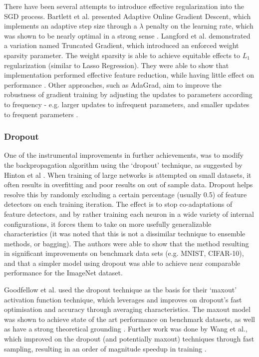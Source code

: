 \documentclass[a4paper,11pt,oneside]{article}
\theoremstyle{plain}
\theoremstyle{definition}
\begin{document}
	There have been several attempts to introduce effective regularization into the SGD process. Bartlett et al. 
	presented Adaptive Online Gradient Descent, which implements an adaptive step size through a $\lambda$ 
	penalty on the learning rate, which was shown to be nearly optimal in a strong sense \cite{Bartlett}. Langford et al. 
	demonstrated a variation named Truncated Gradient, which introduced an enforced weight sparsity parameter. 
	The weight sparsity is able to achieve equitable effects to $L_1$ regularization (similar to Lasso Regression). 
	They were able to show that implementation performed effective feature reduction, while having little effect on 
	performance \cite{Langford}. Other approaches, such as AdaGrad, aim to improve the robustness of gradient training by 
	adjusting the updates to parameters according to frequency - e.g. larger updates to infrequent parameters, and 
	smaller updates to frequent parameters \cite{Duchi, Zeiler}. 
	\hfill\break
	
	\subsubsection{Dropout}
	
	One of the instrumental improvements in further achievements, was to modify the backpropagation 
	algorithm using the ‘dropout’ technique, as suggested by Hinton et al \cite{Hinton4}. When training of large networks is 
	attempted on small datasets, it often results in overfitting and poor results on out of sample data. Dropout helps 
	resolve this by randomly excluding a certain percentage (usually 0.5) of feature detectors on each training iteration. 
	The effect is to stop co-adaptations of feature detectors, and by rather training each neuron in a wide variety of 
	internal configurations, it forces them to take on more usefully generalizable characteristics (it was noted that this
	is not a dissimilar technique to ensemble methods, or bagging). The authors were able to show that the method
	resulting in significant improvements on benchmark data sets (e.g. MNIST, CIFAR-10), and that a simpler model 
	using dropout was able to achieve near comparable performance for the ImageNet dataset.
	\hfill \break 
	
	Goodfellow et al. used the dropout technique as the basis for their ‘maxout’ activation function technique, which 
	leverages and improves on dropout’s fast optimisation and accuracy through averaging characteristics. The 
	maxout model was shown to achieve state of the art performance on benchmark datasets, as well as have a 
	strong theoretical grounding \cite{Goodfellow}. Further work was done by Wang et al., which improved on the dropout 
	(and potentially maxout) techniques through fast sampling, resulting in an order of magnitude speedup in
	training \cite{Wang2}.
	\hfill \break 
	
\end{document}
